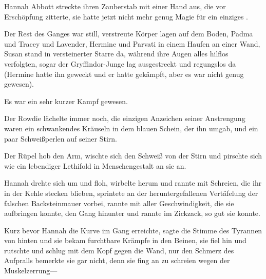 \later

Hannah Abbott streckte ihren Zauberstab mit einer Hand aus, die vor Erschöpfung zitterte, sie hatte jetzt nicht mehr genug Magie für ein einziges .

Der Rest des Ganges war still, verstreute Körper lagen auf dem Boden, Padma und Tracey und Lavender, Hermine und Parvati in einem Haufen an einer Wand, Susan stand in versteinerter Starre da, während ihre Augen alles hilflos verfolgten, sogar der Gryffindor-Junge lag ausgestreckt und regungslos da (Hermine hatte ihn geweckt und er hatte gekämpft, aber es war nicht genug gewesen).

Es war ein sehr kurzer Kampf gewesen.

Der Rowdie lächelte immer noch, die einzigen Anzeichen seiner Anstrengung waren ein schwankendes Kräuseln in dem blauen Schein, der ihn umgab, und ein paar Schweißperlen auf seiner Stirn.

Der Rüpel hob den Arm, wischte sich den Schweiß von der Stirn und pirschte sich wie ein lebendiger Lethifold in Menschengestalt an sie an.

Hannah drehte sich um und floh, wirbelte herum und rannte mit Schreien, die ihr in der Kehle stecken blieben, sprintete an der heruntergefallenen Vertäfelung der falschen Backsteinmauer vorbei, rannte mit aller Geschwindigkeit, die sie aufbringen konnte, den Gang hinunter und rannte im Zickzack, so gut sie konnte.

Kurz bevor Hannah die Kurve im Gang erreichte, sagte die Stimme des Tyrannen von hinten  und sie bekam furchtbare Krämpfe in den Beinen, sie fiel hin und rutschte und schlug mit dem Kopf gegen die Wand, nur den Schmerz des Aufpralls bemerkte sie gar nicht, denn sie fing an zu schreien wegen der Muskelzerrung—

